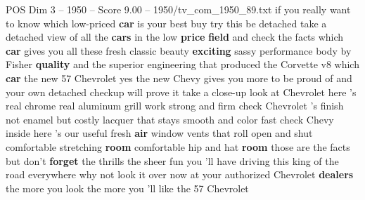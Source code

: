 \begin{textsample}{POS Dim 3 – 1950 – Score 9.00 – 1950/tv\_com\_1950\_89.txt}  \label{ex:f3_pos_002}
if you really want to know which low-priced \textbf{car} is your best buy try this be detached take a detached view of all the \textbf{cars} in the low \textbf{price} \textbf{field} and check the facts which \textbf{car} gives you all these fresh classic beauty \textbf{exciting} sassy performance body by Fisher \textbf{quality} and the superior engineering that produced the Corvette v8 which \textbf{car} the new 57 Chevrolet yes the new Chevy gives you more to be proud of and your own detached checkup will prove it take a close-up look at Chevrolet here 's real chrome real aluminum grill work strong and firm check Chevrolet 's finish not enamel but costly lacquer that stays smooth and color fast check Chevy inside here 's our useful fresh \textbf{air} window vents that roll open and shut comfortable stretching \textbf{room} comfortable hip and hat \textbf{room} those are the facts but don't \textbf{forget} the thrills the sheer fun you 'll have driving this king of the road everywhere why not look it over now at your authorized Chevrolet \textbf{dealers} the more you look the more you 'll like the 57 Chevrolet

\end{textsample}
